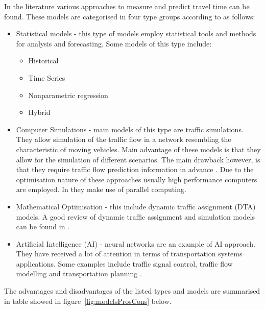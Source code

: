 In the literature various approaches to measure and predict travel time can be found. These models are categorised in four type groups according to \cite{youKim} as follows:
\begin{itemize}
	\item Statistical models - this type of models employ statistical tools and methods for analysis and forecasting. Some models of this type include:
	\begin{itemize}
		\item Historical
		\item Time Series
		\item Nonparametric regression
		\item Hybrid
	\end{itemize}
	
	\item Computer Simulations - main models of this type are traffic simulations. They allow simulation of the traffic flow in a network resembling the characteristic of moving vehicles. Main advantage of these models is that they allow for the simulation of different scenarios. The main drawback however, is that they require traffic flow prediction information in advance \cite{smith1997traffic}. Due to the optimisation nature of these approaches usually high performance computers are employed. In \cite{junchaya1992advanced} they make use of parallel computing.
	
	\item Mathematical Optimisation - this include dynamic traffic assignment (DTA) models. A good review of dynamic traffic assignment and simulation models can be found in \cite{mahmassani1991review}.

	\item Artificial Intelligence (AI) - neural networks are an example of AI approach. They have received a lot of attention in terms of transportation systems applications. Some examples include traffic signal control, traffic flow modelling and transportation planning \cite{gilmore1995neural,Dougherty199721,smith1997traffic}.
\end{itemize}
The advantages and disadvantages of the listed types and models are summarised in table showed in figure~\ref{fig:modelsProsCons} below.

